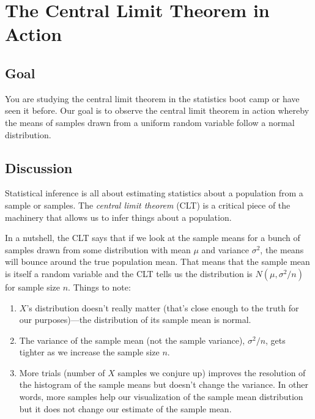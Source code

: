 \documentclass[titlepage]{tufte-book}
\newcounter{problem}
\begin{document}
\chapter{The Central Limit Theorem in Action}

\setcounter{problem}{1}

\section{Goal}

\begin{fullwidth}

You are studying the central limit theorem in the statistics boot camp or have seen it before. Our goal is to observe the central limit theorem in action whereby the means of samples drawn from a uniform random variable follow a normal distribution.

\section{Discussion}

Statistical inference is all about estimating statistics about a population from a sample or samples. The {\em central limit theorem} (CLT) is a critical piece of the machinery that allows us to infer things about a population. 

In a nutshell, the CLT says that if we look at the sample means for a bunch of samples drawn from some distribution with mean $\mu$ and variance $\sigma^2$, the means will bounce around the true population mean.  That means that the sample mean is  itself a random variable and the CLT tells us the distribution is $N(\mu, \sigma^2/n)$ for sample size $n$.  Things to note:

\begin{enumerate}
\item $X$'s distribution doesn't really matter (that's close enough to the truth for our purposes)---the distribution of its sample mean is normal. 

\item The variance of the sample mean (not the sample variance), $\sigma^2/n$, gets tighter as we increase the sample size $n$.

\item More trials (number of $X$ samples we conjure up) improves the resolution of the histogram of the sample means but doesn't change the variance. In other words,  more samples help our visualization of the sample mean distribution but it does not change our estimate of the sample mean.
\end{enumerate}


\end{fullwidth}
\end{document}
